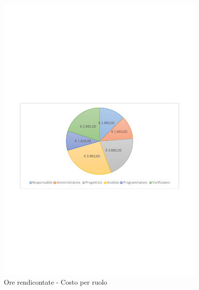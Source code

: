 \documentclass[../PianoProgetto.tex]{subfiles}
\begin{document}
\vfill	
	\begin{figure}[!h]
		\centering
		\includegraphics[width=0.93\textwidth , trim=2cm 9.5cm 2cm 11cm]{grafici/Riepilogo/Rendicontate/costo}
			\caption{Ore rendicontate - Costo per ruolo}
		\label{fig:CircleChart-rendicontate_costo}
	\end{figure}
\vfill			
\end{document}
